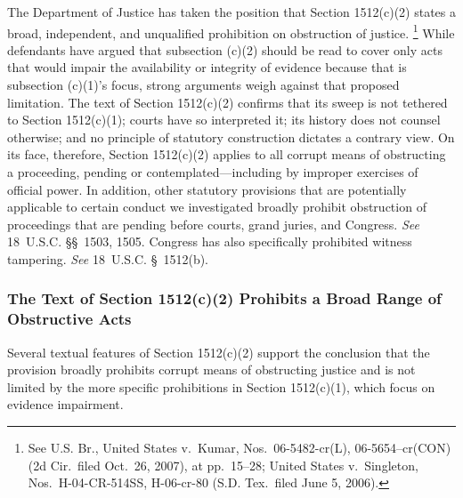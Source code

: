 The Department of Justice has taken the position that Section 1512(c)(2) states a broad, independent, and unqualified prohibition on obstruction of justice.%
\footnote{See U.S. Br., United States v.\ Kumar, Nos.~06-5482-cr(L), 06-5654--cr(CON) (2d Cir.\ filed Oct.~26, 2007), at pp.~15--28; United States v.\ Singleton, Nos.~H-04-CR-514SS, H-06-cr-80 (S.D. Tex.\ filed June 5, 2006).}
While defendants have argued that subsection (c)(2) should be read to cover only acts that would impair the availability or integrity of evidence because that is subsection (c)(1)'s focus, strong arguments weigh against that proposed limitation.
The text of Section 1512(c)(2) confirms that its sweep is not tethered to Section 1512(c)(1); courts have so interpreted it; its history does not counsel otherwise; and no principle of statutory construction dictates a contrary view.
On its face, therefore, Section 1512(c)(2) applies to all corrupt means of obstructing a proceeding, pending or contemplated---including by improper exercises of official power.
In addition, other statutory provisions that are potentially applicable to certain conduct we investigated broadly prohibit obstruction of proceedings that are pending before courts, grand juries, and Congress.
\textit{See} 18~U.S.C. \S\S~1503, 1505.
Congress has also specifically prohibited witness tampering.
\textit{See} 18~U.S.C. \S~1512(b).

\subsubsection{The Text of Section 1512(c)(2) Prohibits a Broad Range of Obstructive Acts}

Several textual features of Section 1512(c)(2) support the conclusion that the provision broadly prohibits corrupt means of obstructing justice and is not limited by the more specific prohibitions in Section 1512(c)(1), which focus on evidence impairment.

